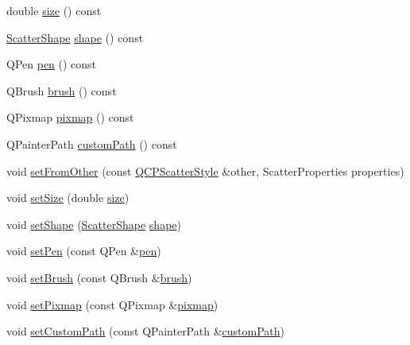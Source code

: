 \begin{DoxyCompactItemize}
\item 
double \hyperlink{class_q_c_p_scatter_style_a1973ee650368f1c5f55507b78473f634}{size} () const 
\item 
\hyperlink{class_q_c_p_scatter_style_adb31525af6b680e6f1b7472e43859349}{Scatter\+Shape} \hyperlink{class_q_c_p_scatter_style_a4462a25ef17769631f4e0aa81dadca4b}{shape} () const 
\item 
Q\+Pen \hyperlink{class_q_c_p_scatter_style_a3c24c3bf37b561b4807aed9f1418ab58}{pen} () const 
\item 
Q\+Brush \hyperlink{class_q_c_p_scatter_style_a46bf481d84bfa31b287dd43a3bf86d37}{brush} () const 
\item 
Q\+Pixmap \hyperlink{class_q_c_p_scatter_style_a9bab44cc41fcd585621a4b3e0e48231b}{pixmap} () const 
\item 
Q\+Painter\+Path \hyperlink{class_q_c_p_scatter_style_a4dd4998dfb0d6889205668a06c790328}{custom\+Path} () const 
\item 
void \hyperlink{class_q_c_p_scatter_style_a7d59ba8864914f765817841089e436f1}{set\+From\+Other} (const \hyperlink{class_q_c_p_scatter_style}{Q\+C\+P\+Scatter\+Style} \&other, Scatter\+Properties properties)
\item 
void \hyperlink{class_q_c_p_scatter_style_aaefdd031052892c4136129db68596e0f}{set\+Size} (double \hyperlink{class_q_c_p_scatter_style_a1973ee650368f1c5f55507b78473f634}{size})
\item 
void \hyperlink{class_q_c_p_scatter_style_a7c641c4d4c6d29cb705d3887cfce91c1}{set\+Shape} (\hyperlink{class_q_c_p_scatter_style_adb31525af6b680e6f1b7472e43859349}{Scatter\+Shape} \hyperlink{class_q_c_p_scatter_style_a4462a25ef17769631f4e0aa81dadca4b}{shape})
\item 
void \hyperlink{class_q_c_p_scatter_style_a761f1f229cc0ca4703e1e2b89f6dd1ba}{set\+Pen} (const Q\+Pen \&\hyperlink{class_q_c_p_scatter_style_a3c24c3bf37b561b4807aed9f1418ab58}{pen})
\item 
void \hyperlink{class_q_c_p_scatter_style_a74d692aaeb8d4b36d6f7d510e44264b1}{set\+Brush} (const Q\+Brush \&\hyperlink{class_q_c_p_scatter_style_a46bf481d84bfa31b287dd43a3bf86d37}{brush})
\item 
void \hyperlink{class_q_c_p_scatter_style_a5fb611d46acfac520d7b89a1c71d9246}{set\+Pixmap} (const Q\+Pixmap \&\hyperlink{class_q_c_p_scatter_style_a9bab44cc41fcd585621a4b3e0e48231b}{pixmap})
\item 
void \hyperlink{class_q_c_p_scatter_style_a96a3e949f90b2afe5677ca9412a12a1e}{set\+Custom\+Path} (const Q\+Painter\+Path \&\hyperlink{class_q_c_p_scatter_style_a4dd4998dfb0d6889205668a06c790328}{custom\+Path})

\end{DoxyCompactItemize}
